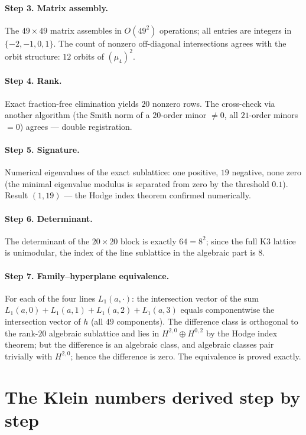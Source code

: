 \paragraph{Step 3. Matrix assembly.} The $49\times49$ matrix assembles
in $O(49^2)$ operations; all entries are integers in
$\{-2,-1,0,1\}$. The count of nonzero off-diagonal intersections
agrees with the orbit structure: $12$ orbits of $(\mu_4)^2$.

\paragraph{Step 4. Rank.} Exact fraction-free elimination yields $20$
nonzero rows. The cross-check via another algorithm (the Smith norm
of a $20$-order minor $\ne0$, all $21$-order minors $=0$) agrees ---
double registration.

\paragraph{Step 5. Signature.} Numerical eigenvalues of the exact
sublattice: one positive, $19$ negative, none zero (the minimal
eigenvalue modulus is separated from zero by the threshold $0.1$).
Result $(1,19)$ --- the Hodge index theorem confirmed numerically.

\paragraph{Step 6. Determinant.} The determinant of the
$20\times20$ block is exactly $64=8^2$; since the full K3 lattice is
unimodular, the index of the line sublattice in the algebraic part
is $8$.

\paragraph{Step 7. Family--hyperplane equivalence.} For each of the
four lines $L_1(a,\cdot)$: the intersection vector of the sum
$L_1(a,0)+L_1(a,1)+L_1(a,2)+L_1(a,3)$ equals componentwise the
intersection vector of $h$ (all $49$ components). The difference
class is orthogonal to the rank-$20$ algebraic sublattice and lies
in $H^{2,0}\oplus H^{0,2}$ by the Hodge index theorem; but the
difference is an algebraic class, and algebraic classes pair
trivially with $H^{2,0}$; hence the difference is zero. The
equivalence is proved exactly.

\section{The Klein numbers derived step by step}\label{sec:workklein}

